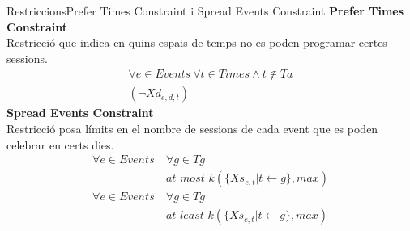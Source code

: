 \documentclass[13pt]{beamer}
\begin{document}
  \begin{frame}{Restriccions}{Prefer Times Constraint i Spread Events Constraint}
    \textbf{Prefer Times Constraint}\\
    Restricció que indica en quins espais de temps no es poden programar certes sessions.
    \begin{gather*}
      \forall e \in Events \ \forall t \in Times \land t \notin Ta \\ (\neg Xd_{e,d,t})
    \end{gather*}
    \textbf{Spread Events Constraint}\\
    Restricció posa límits en el nombre de sessions de 
    cada event que es poden celebrar en certs dies.
        \begin{align*}
          \forall e \in Events \ &\forall g \in Tg \\
          &at\_most\_k(\{Xs_{e,t} | t \leftarrow g\}, max)\\
          \forall e \in Events \ &\forall g \in Tg \\
          &at\_least\_k(\{Xs_{e,t} | t \leftarrow g\}, max)
        \end{align*}    
  \end{frame}
\end{document}
